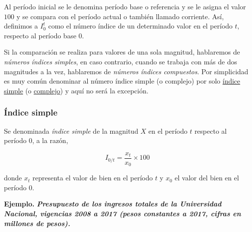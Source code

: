 \documentclass[
  11pt,
]{book}
\begin{document}
Al período inicial se le denomina período base o referencia y se le asigna el valor \(100\) y se compara con el período actual o también llamado corriente. Así, definimos a \(I_{0}^{t}\) como el número índice de un determinado valor en el período \(t\), respecto al período base \(0\).

Si la comparación se realiza para valores de una sola magnitud, hablaremos de \emph{números índices simples}, en caso contrario, cuando se trabaja con más de dos magnitudes a la vez, hablaremos de \emph{números índices compuestos}. Por simplicidad es muy común denominar al número índice simple (o complejo) por solo \protect\hyperlink{indicesimple}{índice simple} (o \protect\hyperlink{indicecomplejo}{complejo}) y aquí no será la excepción.

\hypertarget{indicesimple}{%
\subsubsection{Índice simple}\label{indicesimple}}

Se denominada \emph{índice simple} de la magnitud \(X\) en el período \(t\) respecto al período \(0\), a la razón,

\[\begin{equation}
I_{0/t}=\frac{x_t}{x_0}\times 100
\end{equation}\]

donde \(x_t\) representa el valor de bien en el período \(t\) y \(x_0\) el valor del bien en el período \(0\).

\textbf{Ejemplo.} \textbf{\emph{Presupuesto de los ingresos totales de la Universidad Nacional, vigencias 2008 a 2017 (pesos constantes a 2017, cifras en millones de pesos).}}
\end{document}
